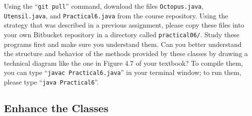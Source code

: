 \begin{sloppypar}
Using the ``{\tt git pull}'' command, download the files {\tt Octopus.java}, {\tt Utensil.java}, and {\tt Practical6.java}
from the course repository. Using the strategy that was described in a previous assignment, please copy these files into
your own Bitbucket repository in a directory called {\tt practical06/}. Study these programs first and make sure you
understand them. Can you better understand the structure and behavior of the methods provided by these classes by
drawing a technical diagram like the one in Figure 4.7 of your textbook? To compile them, you can type ``{\tt javac
  Practical6.java}'' in your terminal window; to run them, please type ``{\tt java Practical6}''.
\end{sloppypar}

\vspace*{-.15in}
\subsection*{Enhance the Classes}
\vspace*{-.05in}

